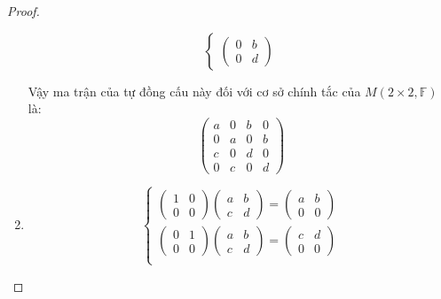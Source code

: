 \documentclass[class=linearalgebra,crop=false]{standalone}
\begin{document}
\begin{proof}
\begin{enumerate}[label = (\alph*)]
\[\begin{cases}
\begin{pmatrix}
                          0 & b \\
                          0 & d
                      \end{pmatrix}
                  \end{cases}
              \]
              \par Vậy ma trận của tự đồng cấu này đối với cơ sở chính tắc của $M(2\times 2,\mathbb{F})$ là:
              \[
                  \begin{pmatrix}
                      a & 0 & b & 0 \\
                      0 & a & 0 & b \\
                      c & 0 & d & 0 \\
                      0 & c & 0 & d
                  \end{pmatrix}
              \]
        \item
              \[
                  \begin{cases}
                      \begin{pmatrix}
                          1 & 0 \\
                          0 & 0
                      \end{pmatrix}
                      \begin{pmatrix}
                          a & b \\
                          c & d
                      \end{pmatrix}=
                      \begin{pmatrix}
                          a & b \\
                          0 & 0
                      \end{pmatrix} \\
                      \begin{pmatrix}
                          0 & 1 \\
                          0 & 0
                      \end{pmatrix}
                      \begin{pmatrix}
                          a & b \\
                          c & d
                      \end{pmatrix}=
                      \begin{pmatrix}
                          c & d \\
                          0 & 0
                      \end{pmatrix} \\

\end{cases}\]
\end{enumerate}
\end{proof}
\end{document}
